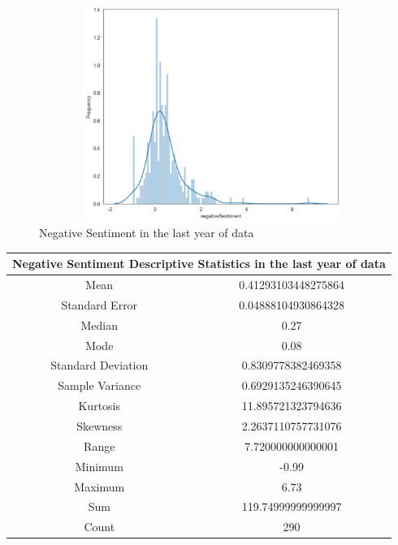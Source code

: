 \begin{figure}[h!]
    \centering
    \includegraphics[width=15cm,height=7cm,keepaspectratio]{resultsEvaluation/negativeDesc1.png}
    \caption{Negative Sentiment in the last year of data}
    \label{fig:appendix_negativeDesc1}
\end{figure}
\begin{center}
\begin{tabular}{ c c }
\hline
\multicolumn{2}{|c|}{Negative Sentiment Descriptive Statistics in the last year of data} \\
\hline
Mean & 0.41293103448275864 \\
Standard Error & 0.04888104930864328 \\
Median & 0.27 \\
Mode & 0.08 \\
Standard Deviation & 0.8309778382469358 \\
Sample Variance & 0.6929135246390645 \\
Kurtosis & 11.895721323794636 \\
Skewness & 2.2637110757731076 \\
Range & 7.720000000000001 \\
Minimum & -0.99 \\
Maximum & 6.73 \\
Sum & 119.74999999999997 \\
Count & 290
\end{tabular}
\end{center}